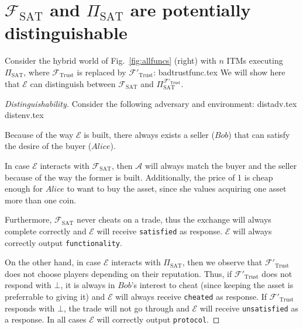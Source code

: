 \section{$\mathcal{F}_{\mathrm{SAT}}$ and $\Pi_{\mathrm{SAT}}$ are potentially
distinguishable}
  Consider the hybrid world of Fig.~\ref{fig:allfuncs} (right) with $n$ ITMs executing
  $\Pi_{\mathrm{SAT}}$, where $\mathcal{F}_{\mathrm{Trust}}$ is replaced by
  $\mathcal{F}'_{\mathrm{Trust}}$:
  {badtrustfunc.tex}
  We will show here that $\mathcal{E}$ can distinguish between
  $\mathcal{F}_{\mathrm{SAT}}$ and $\Pi_{\mathrm{SAT}}^{\mathcal{F}'_{\mathrm{Trust}}}$.
  \begin{proof}[Distinguishability]
    Consider the following adversary and environment:
    {distadv.tex}
    {distenv.tex}

    Because of the way $\mathcal{E}$ is built, there always exists a seller ($Bob$) that
    can satisfy the desire of the buyer ($Alice$).

    In case $\mathcal{E}$ interacts with $\mathcal{F}_{\mathrm{SAT}}$, then $\mathcal{A}$
    will always match the buyer and the seller because of the way the former is built.
    Additionally, the price of 1 is cheap enough for $Alice$ to want to buy the asset,
    since she values acquiring one asset more than one coin.

    Furthermore, $\mathcal{F}_{\mathrm{SAT}}$ never cheats on a trade, thus the exchange
    will always complete correctly and $\mathcal{E}$ will receive \texttt{satisfied} as
    response. $\mathcal{E}$ will always correctly output \texttt{functionality}.

    On the other hand, in case $\mathcal{E}$ interacts with $\Pi_{\mathrm{SAT}}$, then we
    observe that $\mathcal{F}'_{\mathrm{Trust}}$ does not choose players depending on
    their reputation.  Thus, if $\mathcal{F}'_{\mathrm{Trust}}$ does not respond with
    $\bot$, it is always in $Bob$'s interest to cheat (since keeping the asset is
    preferrable to giving it) and $\mathcal{E}$ will always receive \texttt{cheated} as
    response. If $\mathcal{F}'_{\mathrm{Trust}}$ responds with $\bot$, the trade will not
    go through and $\mathcal{E}$ will receive \texttt{unsatisfied} as a response. In all
    cases $\mathcal{E}$ will correctly output \texttt{protocol}.
  \end{proof}
